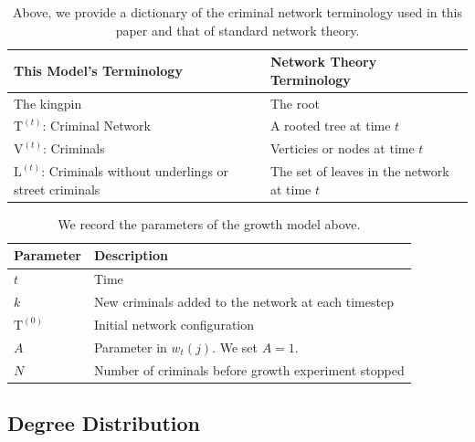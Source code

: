 \documentclass[11pt]{article}
\renewcommand{\L}{\mathrm{L}}
\newcommand{\T}{\mathrm{T}}
\newcommand{\V}{\mathrm{V}}
\theoremstyle{plain}
\theoremstyle{definition}
\begin{document}
\begin{table}\centering
\begin{tabular}{|m{5.75cm}|m{5.75cm}|}
\hline
This Model's Terminology&Network Theory Terminology\\
\hline
\hline
The kingpin& The root\\
\hline
$\T^{(t)}$: Criminal Network& A rooted tree at time $t$\\
\hline
$\V^{(t)}$: Criminals & Verticies or nodes at time $t$\\
\hline
$\L^{(t)}$: Criminals without underlings or street criminals& The set of leaves in the network at time $t$\\
\hline
\end{tabular}
\caption{Above, we provide a dictionary of the criminal network terminology used in this paper and that of standard network theory.}
\end{table}
\begin{table}\centering
  \begin{tabular}{|m{2cm}|p{9.75cm}|}
\hline
Parameter&Description\\
\hline
\hline
$t$& Time\\
\hline
$k$ & New criminals added to the network at each timestep\\
\hline
$\T^{(0)}$& Initial network configuration\\
\hline
$A$& Parameter in $w_t(j)$.  We set $A = 1$.\\
\hline
$N$& Number of criminals before growth experiment stopped\\
\hline
\end{tabular}
  \caption{We record the parameters of the growth model above.}
\end{table}

  
  
\subsection*{Degree Distribution}
\end{document}

